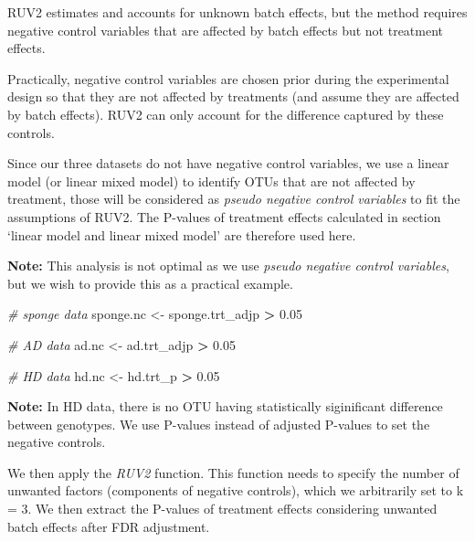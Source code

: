 \documentclass[]{book}
\newenvironment{Shaded}{\begin{snugshade}}{\end{snugshade}}
\newcommand{\FloatTok}[1]{\textcolor[rgb]{0.00,0.00,0.81}{#1}}
\newcommand{\StringTok}[1]{\textcolor[rgb]{0.31,0.60,0.02}{#1}}
\newcommand{\CommentTok}[1]{\textcolor[rgb]{0.56,0.35,0.01}{\textit{#1}}}
\newcommand{\OperatorTok}[1]{\textcolor[rgb]{0.81,0.36,0.00}{\textbf{#1}}}
\newcommand{\NormalTok}[1]{#1}
\begin{document}
RUV2 estimates and accounts for unknown batch effects, but the method
requires negative control variables that are affected by batch effects
but not treatment effects.

Practically, negative control variables are chosen prior during the
experimental design so that they are not affected by treatments (and
assume they are affected by batch effects). RUV2 can only account for
the difference captured by these controls.

Since our three datasets do not have negative control variables, we use
a linear model (or linear mixed model) to identify OTUs that are not
affected by treatment, those will be considered as \emph{pseudo negative
control variables} to fit the assumptions of RUV2. The P-values of
treatment effects calculated in section `linear model and linear mixed
model' are therefore used here.

\textbf{Note:} This analysis is not optimal as we use \emph{pseudo
negative control variables}, but we wish to provide this as a practical
example.

\begin{Shaded}
\begin{Highlighting}[]
\CommentTok{# sponge data}
\NormalTok{sponge.nc <-}\StringTok{ }\NormalTok{sponge.trt_adjp }\OperatorTok{>}\StringTok{ }\FloatTok{0.05}

\CommentTok{# AD data}
\NormalTok{ad.nc <-}\StringTok{ }\NormalTok{ad.trt_adjp }\OperatorTok{>}\StringTok{ }\FloatTok{0.05}

\CommentTok{# HD data}
\NormalTok{hd.nc <-}\StringTok{ }\NormalTok{hd.trt_p }\OperatorTok{>}\StringTok{ }\FloatTok{0.05}
\end{Highlighting}
\end{Shaded}

\textbf{Note:} In HD data, there is no OTU having statistically
siginificant difference between genotypes. We use P-values instead of
adjusted P-values to set the negative controls.

We then apply the \emph{RUV2} function. This function needs to specify
the number of unwanted factors (components of negative controls), which
we arbitrarily set to k = 3. We then extract the P-values of treatment
effects considering unwanted batch effects after FDR adjustment.
\end{document}
